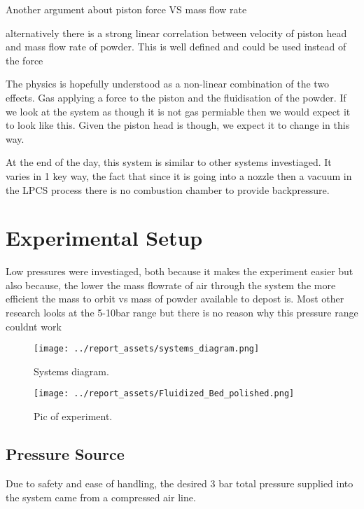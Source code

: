 Another argument about piston force VS mass flow rate

alternatively there is a strong linear correlation between velocity of piston head and mass flow rate of powder. This is well defined and could be used instead of the force


The physics is hopefully understood as a non-linear combination of the two effects. Gas applying a force to the piston and the fluidisation of the powder. If we look at the system as though it is not gas permiable then we would expect it to look like this. Given the piston head is though, we expect it to change in this way.

At the end of the day, this system is similar to other systems investiaged. It varies in 1 key way, the fact that since it is going into a nozzle then a vacuum in the LPCS process there is no combustion chamber to provide backpressure.
\newpage
\section{Experimental Setup}
Low pressures were investiaged, both because it makes the experiment easier but also because, the lower the mass flowrate of air through the system the more efficient the mass to orbit vs mass of powder available to depost is. Most other research looks at the 5-10bar range but there is no reason why this pressure range couldnt work
\begin{figure}[htbp]
    \centering

    \begin{minipage}{0.95\textwidth}
        \centering
        \texttt{[image: ../report\_assets/systems\_diagram.png]}
        \caption{Systems diagram.}\label{fig:systems-diagram}
    \end{minipage}
    \hfill
    \begin{minipage}{0.45\textwidth}
        \centering
        \texttt{[image: ../report\_assets/Fluidized\_Bed\_polished.png]}
        \caption{Pic of experiment.}\label{fig:experiment-image}
    \end{minipage}

\end{figure}

\subsection{Pressure Source}
Due to safety and ease of handling, the desired 3 bar total pressure supplied into the system came from a compressed air line. 
\newpage
